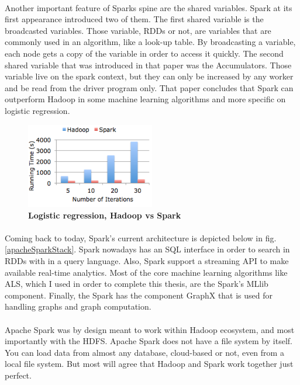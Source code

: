 \paragraph{}Another important feature of Sparks spine are the shared variables. Spark at its first appearance introduced two of them. The first shared variable is the broadcasted variables. Those variable, RDDs or not, are variables that are commonly used in an algorithm, like a look-up table. By broadcasting a variable, each node gets a copy of the variable in order to access it quickly. The second shared variable that was introduced in that paper was the Accumulators. Those variable live on the spark context, but they can only be increased by any worker and be read from the driver program only. That paper concludes that Spark can outperform Hadoop in some machine learning algorithms and more specific on logistic regression.

\begin{figure}[ht]
  \centering
    \includegraphics[width=0.5\textwidth]{images/hadoopVsSpark.png}
    \caption{\bfseries Logistic regression, Hadoop vs Spark \cite{HadoopVsSpark}}
   \label{hadoopVsSpark}
\end{figure}

\paragraph{}Coming back to today, Spark's current architecture is depicted below in fig. \ref{apacheSparkStack}. Spark nowadays has an SQL interface in order to search in RDDs with in a query language. Also, Spark support a streaming API to make available real-time analytics. Most of the core machine learning algorithms like ALS, which I used in order to complete this thesis, are the Spark's MLlib component. Finally, the Spark has the component GraphX that is used for handling graphs and graph computation.

\paragraph{}Apache Spark was by design meant to work within Hadoop ecosystem, and most importantly with the HDFS. Apache Spark does not have a file system by itself. You can load data from almost any database, cloud-based or not, even from a local file system. But most will agree that Hadoop and Spark work together just perfect.

